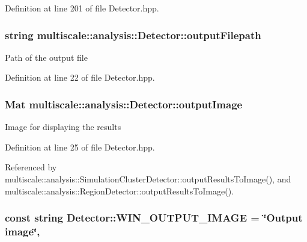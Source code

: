 Definition at line 201 of file Detector.\-hpp.

\hypertarget{classmultiscale_1_1analysis_1_1Detector_a1a83df16d8afd347c0e1c9ddc41c9bee}{
\subsubsection[{output\-Filepath}]{\setlength{\rightskip}{0pt plus 5cm}string multiscale\-::analysis\-::\-Detector\-::output\-Filepath\hspace{0.3cm}{\ttfamily [protected]}}}\label{classmultiscale_1_1analysis_1_1Detector_a1a83df16d8afd347c0e1c9ddc41c9bee}
Path of the output file 

Definition at line 22 of file Detector.\-hpp.

\hypertarget{classmultiscale_1_1analysis_1_1Detector_a144e080a3af03c9bf3d8a80315823c86}{
\subsubsection[{output\-Image}]{\setlength{\rightskip}{0pt plus 5cm}Mat multiscale\-::analysis\-::\-Detector\-::output\-Image\hspace{0.3cm}{\ttfamily [protected]}}}\label{classmultiscale_1_1analysis_1_1Detector_a144e080a3af03c9bf3d8a80315823c86}
Image for displaying the results 

Definition at line 25 of file Detector.\-hpp.



Referenced by multiscale\-::analysis\-::\-Simulation\-Cluster\-Detector\-::output\-Results\-To\-Image(), and multiscale\-::analysis\-::\-Region\-Detector\-::output\-Results\-To\-Image().

\hypertarget{classmultiscale_1_1analysis_1_1Detector_a883b5de8d273a2bfab31e45bc285c78d}{
\subsubsection[{W\-I\-N\-\_\-\-O\-U\-T\-P\-U\-T\-\_\-\-I\-M\-A\-G\-E}]{\setlength{\rightskip}{0pt plus 5cm}const string Detector\-::\-W\-I\-N\-\_\-\-O\-U\-T\-P\-U\-T\-\_\-\-I\-M\-A\-G\-E = \char`\"{}Output {\bf image}\char`\"{}\hspace{0.3cm}{\ttfamily [static]}, {\ttfamily [protected]}}}\label{classmultiscale_1_1analysis_1_1Detector_a883b5de8d273a2bfab31e45bc285c78d}


